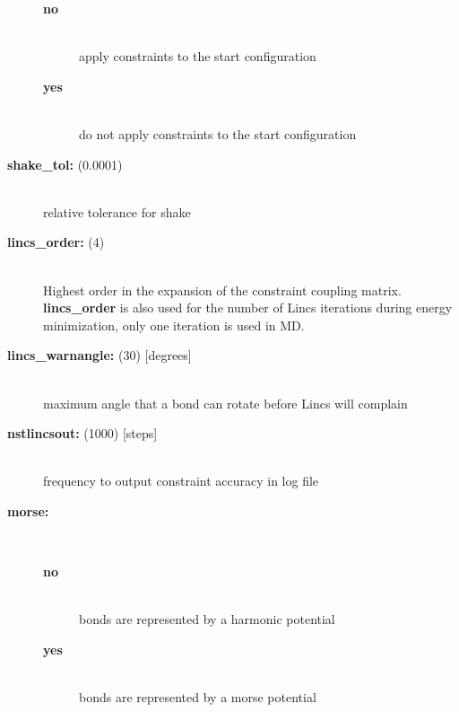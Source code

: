 \begin{description}
\vspace{-2ex}\begin{description}
\item[{\bf no}]\mbox{}\\
apply constraints to the start configuration
\item[{\bf yes}]\mbox{}\\
do not apply constraints to the start configuration
\end{description}
\item[{\bf shake\_tol: }(0.0001)]\mbox{}\\
relative tolerance for shake
\item[{\bf lincs\_order: }(4)]\mbox{}\\
Highest order in the expansion of the constraint coupling matrix.
{\bf lincs\_order} is also used for the number of Lincs iterations
during energy minimization, only one iteration is used in MD.
\item[{\bf lincs\_warnangle: }(30) {[degrees]}]\mbox{}\\
maximum angle that a bond can rotate before Lincs will complain
\item[{\bf nstlincsout: }(1000) {[steps]}]\mbox{}\\
frequency to output constraint accuracy in log file
\item[{\bf morse:}]\mbox{}\\
\vspace{-2ex}\begin{description}
\item[{\bf no}]\mbox{}\\
bonds are represented by a harmonic potential
\item[{\bf yes}]\mbox{}\\
bonds are represented by a morse potential
\end{description}
\end{description}

